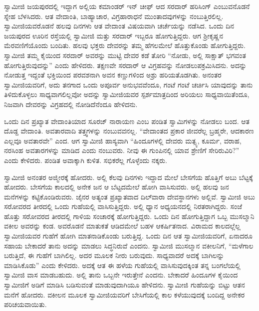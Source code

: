  ಸ್ವಾಮೀಜಿ ಜಯಪುರದಲ್ಲಿ ಇದ್ದಾಗ ಅಲ್ಲಿಯ ಕಮಾಂಡರ್ ಇನ್ ‍ಚೀಫ್ ಆದ ಸರದಾರ್ ಹರಿಸಿಂಗ್ ಎಂಬುವನೊಡನೆ ಸ್ನೇಹ ಬೆಳಸಿದರು. ಆತ ವೇದಾಂತಿ, ಬಾಹ್ಯಾಚಾರ, ವಿಗ್ರಹಾರಾಧನೆ ಮುಂತಾದವುಗಳನ್ನು ನಂಬುತ್ತಿರಲಿಲ್ಲ. ಸ್ವಾಮೀಜಿಯವರೊಡನೆ ಹಲವು ದಿನಗಳು ಆತ ವೇದಾಂತ ವಿಷಯವಾಗಿ ಚರ್ಚೆಯನ್ನು ನಡೆಸಿದ. ಒಂದು ದಿನ ಜಯಪುರದ ಊರಿನ ರಸ್ತೆಯಲ್ಲಿ ಸ್ವಾಮೀಜಿ ಮತ್ತು ಸರದಾರ್ ಇಬ್ಬರೂ ಹೋಗುತ್ತಿದ್ದರು. ಆಗ ಶ‍್ರೀಕೃಷ್ಣನ ಮೆರವಣಿಗೆಯೊಂದು ಬಂದಿತು. ಹಲವು ಭಕ್ತರು ದೇವರನ್ನು ತಮ್ಮ ಹೆಗಲಮೇಲೆ ಹೊತ್ತುಕೊಂಡು ಹೋಗುತ್ತಿದ್ದರು. ಸ್ವಾಮೀಜಿ ತಮ್ಮ ಕೈಯಿಂದ ಸರದಾರ್ ಅವರನ್ನು ಮುಟ್ಟಿ ದೇವರ ಕಡೆ ತೋರಿ “ನೋಡು, ಅಲ್ಲಿ ಸಾಕ್ಷಾತ್ ಭಗವಂತ ಹೋಗುತ್ತಿರುವುದನ್ನು” ಎಂದು ಹೇಳಿದರು. ತಕ್ಷಣವೇ ಸರದಾರ್ ಆ ವಿಗ್ರಹವನ್ನು ನೋಡಲುಪಕ್ರಮಿಸಿದನು. ಅದನ್ನು ನೋಡುತ್ತ ಇದ್ದಂತೆ ಭಕ್ತಿಯಿಂದ ಪರವಶನಾಗಿ ಅವನ ಕಣ್ಣುಗಳಿಂದ ಅಶ್ರು ಹರಿಯತೊಡಗಿತು. ಅನಂತರ ಸ್ವಾಮೀಜಿಯವರಿಗೆ, ಅದು ತನಗಾದ ಒಂದು ಅಪೂರ್ವ ಅನುಭವವೆಂದೂ, ಗಂಟೆ ಗಂಟೆ ಚರ್ಚಿಸಿ ಯಾವುದನ್ನು ತಾನು ತಿಳಿದುಕೊಳ್ಳಲು ಸಾಧ್ಯವಾಗಲಿಲ್ಲವೋ ಅದನ್ನು ಸ್ವಾಮೀಜಿಯವರ ಸ್ಪರ್ಶಮಾತ್ರದಿಂದ ಅರಿಯಲು ಸಾಧ್ಯವಾಯಿತೆಂದೂ, ನಿಜವಾಗಿ ದೇವರನ್ನು ವಿಗ್ರಹದಲ್ಲಿ ನೋಡಿದೆನೆಂದೂ ಹೇಳಿದನು. 

 ಒಂದು ದಿನ ಪ್ರಖ್ಯಾತ ವೇದಾಂತಿಯಾದ ಸೂರಜ್ ನಾರಾಯಣ ಎಂಬ ಪಂಡಿತ ಸ್ವಾಮಿಗಳನ್ನು ನೋಡಲು ಬಂದ. ಆತ ದೊಡ್ದ ವೇದಾಂತಿ. ಅವತಾರವಾದಿ ತತ್ತ್ವಗಳನ್ನು ನಂಬುವವನಲ್ಲ. “ವೇದಾಂತದ ಪ್ರಕಾರ ಜೀವರೆಲ್ಲ ಬ್ರಹ್ಮರೇ, ಆದಕಾರಣ ಎಲ್ಲವೂ ಅವತಾರವೇ” ಎಂದ. ಆಗ ಸ್ವಾಮೀಜಿ ಹಾಸ್ಯವಾಗಿ “ಹಿಂದೂಗಳಲ್ಲಿ ದೇವರು ಮತ್ಸ್ಯ, ಕೂರ್ಮ, ವರಾಹ, ನರಸಿಂಹ ಅವತಾರಗಳನ್ನು ಮಾಡಿದ ಎಂದು ನಂಬುವರು. ನೀವು ಈ ಗುಂಪಿನಲ್ಲಿ ಯಾವ ಶ್ರೇಣಿಗೆ ಸೇರಿರುವಿರಿ?” ಎಂದು ಕೇಳಿದರು. ಪಂಡಿತ ಅವಾಕ್ಕಾಗಿ ಕುಳಿತ. ಸಭಿಕರೆಲ್ಲ ಗೊಳ್ಳೆಂದು ನಕ್ಕರು. 

 ಸ್ವಾಮೀಜಿ ಅನಂತರ ಅಜ್ಮೀರಕ್ಕೆ ಹೋದರು. ಅಲ್ಲಿ ಕೆಲವು ದಿನಗಳು ಇದ್ದಾದ ಮೇಲೆ ಬೇಸಗೆಯ ಹೊತ್ತಿಗೆ ಅಬು ಬೆಟ್ಟಕ್ಕೆ ಹೋದರು. ಬೇಸಗೆಯ ಕಾಲದಲ್ಲಿ ಅನೇಕ ಜನ ಆ ಬೆಟ್ಟದಮೇಲೆ ಹೋಗಿ ವಾಸಿಸುವರು. ಅಲ್ಲಿ ಹಲವು ಜನ ಮನೆಗಳನ್ನು ಕಟ್ಟಿಕೊಂಡಿರುವರು. ಜೈನರ ಅತ್ಯಂತ ಪ್ರಖ್ಯಾತವಾದ ದಿಲ್‍ವಾರಾ ದೇವಸ್ಥಾನಗಳು ಅಲ್ಲಿವೆ. ಸ್ವಾಮೀಜಿ ಅಬು ಸರೋವರದ ತೀರದಲ್ಲಿ ಒಂದು ಗುಹೆಯಲ್ಲಿ ವಾಸಿಸುತ್ತಿದ್ದರು. ಅಲ್ಲಿ ಧ್ಯಾನ ಅಧ್ಯಯನದಲ್ಲಿ ನಿರತರಾಗಿದ್ದರು. ಸಂಜೆ ಹೊತ್ತು ಸರೋವರದ ತೀರದಲ್ಲಿ ಗಾಳಿಯ ಸಂಚಾರಕ್ಕೆ ಹೋಗುತ್ತಿದ್ದರು. ಒಂದು ದಿನ ಹೋಗುತ್ತಿದ್ದಾಗ ಒಬ್ಬ ಮುಸಲ್ಮಾನಿ ವಕೀಲ ಅವರನ್ನು ಕಂಡ. ಅವರೊಡನೆ ಮಾತುಕತೆ ಆಡಿದಮೇಲೆ ಬಹಳ ಆಕರ್ಷಿತನಾದ. ವಿರಾಮದ ಕಾಲದಲ್ಲೆಲ್ಲ ಸ್ವಾಮೀಜಿಯವರ ಗುಹೆಗೆ ಹೋಗಿ ಮಾತನಾಡಿಕೊಂಡು ಬರುತ್ತಿದ್ದ. ಒಂದು ದಿನ ಆತ ಸ್ವಾಮೀಜಿಯವರಿಗೆ, ಏನಾದರೂ ಸಹಾಯ ಬೇಕಾದರೆ ತಾನು ಅದನ್ನು ಮಾಡಲು ಸಿದ್ಧನಿರುವೆ ಎಂದನು. ಸ್ವಾಮೀಜಿ ಮುಸಲ್ಮಾನ ವಕೀಲನಿಗೆ, “ಮಳೆಗಾಲ ಬರುತ್ತಿದೆ, ಈ ಗುಹೆಗೆ ಬಾಗಿಲಿಲ್ಲ. ಅದರ ಮೂಲಕ ನೀರು ಬರುವುದು. ಸಾಧ್ಯವಾದರೆ ಅದಕ್ಕೆ ಬಾಗಿಲನ್ನು ಮಾಡಿಸಿಕೊಡು” ಎಂದು ಕೇಳಿದರು. ಅದಕ್ಕೆ ಆತ ಈ ಹಳೆಯ ಗುಹೆಯಲ್ಲಿ ವಾಸಿಸುವುದಕ್ಕಿಂತ ತನ್ನ ಬಂಗಲೆಯಲ್ಲಿ ಸ್ವಾಮೀಜಿ ವಾಸ ಮಾಡಬಹುದು. ಅಲ್ಲಿ ತಾನು ಒಬ್ಬನೇ ಇರುತ್ತೇನೆ ಎಂದನು. ಬೇಕಾದರೆ ಹಿಂದೂಗಳ ಕೈಯಿಂದ ಸ್ವಾಮೀಜಿಗೆ ಅಡಿಗೆ ಮಾಡಿಸಿ ಬಡಿಸುವಂತೆ ಮಾಡುವುದಾಗಿಯೂ ಹೇಳಿದನು. ಸ್ವಾಮೀಜಿ ಗುಹೆಯನ್ನು ಬಿಟ್ಟು ಆತನ ಮನೆಗೆ ಹೋದರು. ವಕೀಲನ ಮೂಲಕ ಸ್ವಾಮೀಜಿಯವರಿಗೆ ಬೇಸಿಗೆಯಲ್ಲಿ ಕಾಲ ಕಳೆಯುವುದಕ್ಕೆ ಬಂದಿದ್ದ ಅನೇಕರ ಪರಿಚಯವಾಯಿತು. 

